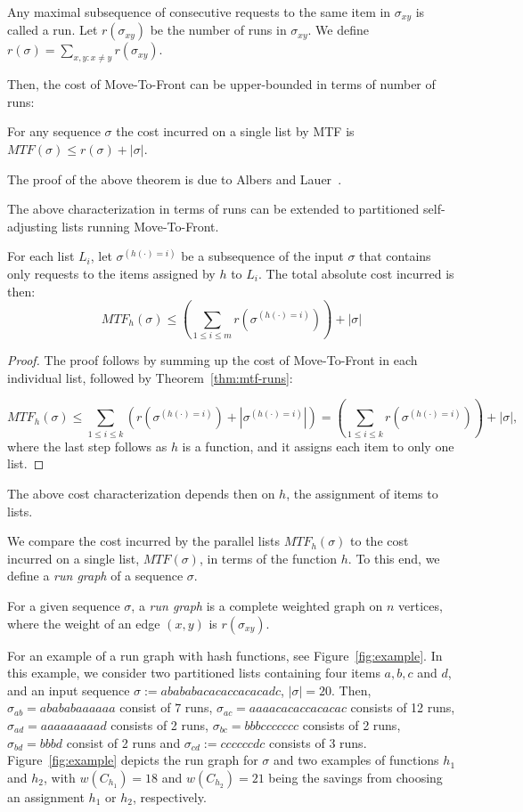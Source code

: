 \begin{definition}
	Any maximal subsequence of consecutive requests to the same item in $\sigma_{xy}$ is called a run. Let $r(\sigma_{xy})$ be the number of runs in $\sigma_{xy}$. 
	We define $r(\sigma) = \sum_{x,y : x \neq y} r(\sigma_{xy})$.
\end{definition}
%
Then, the cost of Move-To-Front can be upper-bounded in terms of number of runs:
%
\begin{theorem}
	For any sequence $\sigma$ the cost incurred on a single list by MTF is 
	$MTF(\sigma) \le r(\sigma) + |\sigma|$.
	\label{thm:mtf-runs}
\end{theorem}
The proof of the above theorem is due to Albers and Lauer~\cite{AlbersL16}.

The above characterization in terms of runs can be extended to partitioned self-adjusting lists running Move-To-Front.
\begin{lemma}
	For each list $L_i$, let $\sigma^{(h(\cdot) = i)}$ be a subsequence of the input $\sigma$ that contains only requests to the items assigned by $h$ to $L_i$.
	The total absolute cost incurred is then:
	$$
	MTF_h(\sigma) \le (\sum_{1 \le i \le m} r(\sigma^{(h(\cdot) = i)})) + |\sigma|
	$$
	\label{lem:parallel-cost-mtf}
\end{lemma}
\begin{proof}
	The proof follows by summing up the cost of Move-To-Front in each individual list, followed by Theorem~\ref{thm:mtf-runs}:
	
	$$ MTF_h(\sigma) \le \sum_{1 \le i \le k} (r(\sigma^{(h(\cdot) = i)}) + |\sigma^{(h(\cdot) = i)}|) = (\sum_{1 \le i \le k} r(\sigma^{(h(\cdot) = i)})) + |\sigma|,$$
	where the last step follows as $h$ is a function, and it assigns each item to only one list.
\end{proof}
The above cost characterization depends then on $h$, the assignment of items to lists.

We compare the cost incurred by the parallel lists $MTF_h(\sigma)$ to the cost incurred on a single list, $MTF(\sigma)$, in terms of the function $h$.
To this end, we define a \emph{run graph} of a sequence $\sigma$.
\begin{definition}
	For a given sequence $\sigma$, a \emph{run graph} is a complete weighted graph on $n$ vertices, where the weight of an edge $(x,y)$ is $r(\sigma_{xy})$.
\end{definition}

For an example of a run graph with hash functions, see Figure~\ref{fig:example}.
In this example, we consider two partitioned lists containing four items $a,b,c$ and $d$, and an input sequence $\sigma := abababacacaccacacadc$, $|\sigma| = 20$.
Then, $\sigma_{ab} = abababaaaaaa$ consist of $7$ runs, $\sigma_{ac} = aaaacacaccacacac$ consists of 12 runs, 
$\sigma_{ad} = aaaaaaaaad$ consists of 2 runs, 
$\sigma_{bc} = bbbccccccc$ consists of 2 runs,  $\sigma_{bd} = bbbd$ consist of 2 runs and $\sigma_{cd} := ccccccdc$ consists of 3 runs.
Figure~\ref{fig:example} depicts the run graph for $\sigma$ and two examples of functions $h_1$ and $h_2$, with $w(C_{h_1}) = 18$ and $w(C_{h_2}) = 21$ being the savings from choosing an assignment $h_1$ or $h_2$, respectively.


